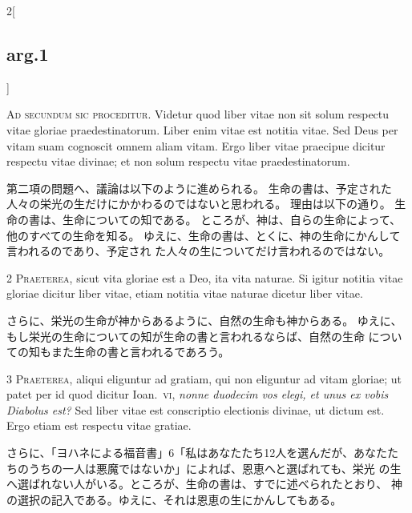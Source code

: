 \documentclass[paper=a4paper,fontsize=10pt,jafontsize=9pt,titlepage]{jlreq}
\begin{document}
\begin{paracol}{2}[\subsection{arg.1}]

{\Huge A}{\scshape d secundum sic proceditur}. Videtur quod
 liber vitae non sit solum respectu vitae gloriae
 praedestinatorum. Liber enim vitae est notitia vitae. Sed Deus per
 vitam suam cognoscit omnem aliam vitam. Ergo liber vitae praecipue
 dicitur respectu vitae divinae; et non solum respectu vitae
 praedestinatorum.

\switchcolumn

第二項の問題へ、議論は以下のように進められる。
生命の書は、予定された人々の栄光の生だけにかかわるのではないと思われる。
 理由は以下の通り。
生命の書は、生命についての知である。
ところが、神は、自らの生命によって、他のすべての生命を知る。
ゆえに、生命の書は、とくに、神の生命にかんして言われるのであり、予定され
 た人々の生についてだけ言われるのではない。


{\scshape 2 Praeterea}, sicut vita gloriae est a Deo,
 ita vita naturae. Si igitur notitia vitae gloriae dicitur liber vitae,
 etiam notitia vitae naturae dicetur liber vitae.

\switchcolumn

さらに、栄光の生命が神からあるように、自然の生命も神からある。
ゆえに、もし栄光の生命についての知が生命の書と言われるならば、自然の生命
 についての知もまた生命の書と言われるであろう。


{\scshape 3 Praeterea}, aliqui eliguntur ad gratiam, qui
 non eliguntur ad vitam gloriae; ut patet per id quod dicitur Ioan.~{\scshape vi},
 {\itshape nonne duodecim vos elegi, et unus ex vobis Diabolus est?} Sed liber
 vitae est conscriptio electionis divinae, ut dictum est. Ergo etiam est
 respectu vitae gratiae.

\switchcolumn

さらに、「ヨハネによる福音書」6「私はあなたたち12人を選んだが、あなたた
 ちのうちの一人は悪魔ではないか」によれば、恩恵へと選ばれても、栄光
 の生へ選ばれない人がいる。ところが、生命の書は、すでに述べられたとおり、
 神の選択の記入である。ゆえに、それは恩恵の生にかんしてもある。


\end{paracol}
\end{document}
